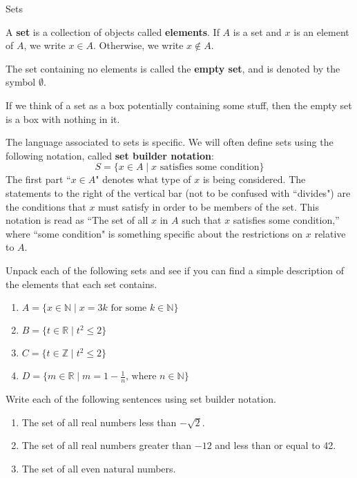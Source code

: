 \begin{section}{Sets}

\begin{definition}
A \textbf{set} is a collection of objects called \textbf{elements}. If $A$ is a set and $x$ is an element of $A$, we write
$x\in A$. Otherwise, we write $x\notin A$.
\end{definition}

\begin{definition}
The set containing no elements is called the \textbf{empty set}, and is denoted by the symbol $\emptyset$.
\end{definition}

If we think of a set as a box potentially containing some stuff, then the empty set is a box with nothing in it.

\begin{definition} 
The language associated to sets is specific.  We will often define sets using the following notation, called \textbf{set builder notation}:
\[
\boxed{S=\{x \in A\mid x \mbox{ satisfies some condition}\}}
\]
The first part ``$x \in A$" denotes what type of $x$ is being considered.  The statements to the right of the vertical bar (not to be confused with ``divides") are the conditions that $x$ must satisfy in order to be members of the set.  This notation is read as ``The set of all $x$ in $A$ such that $x$ satisfies some condition,'' where ``some condition" is something specific about the restrictions on $x$ relative to $A$.
\end{definition}

\begin{exercise}
Unpack each of the following sets and see if you can find a simple description of the elements that each set contains.
\begin{enumerate}[label=\textrm{(\alph*)}]
\item $A=\{x \in \mathbb{N} \mid x = 3k \mbox{ for some } k\in \mathbb{N} \}$
\item $B=\{t \in \mathbb{R} \mid t^2 \leq 2 \}$
\item $C=\{t \in \mathbb{Z} \mid t^2 \leq 2 \}$
\item $D=\{m \in \mathbb{R} \mid m = 1 - \frac{1}{n} \mbox{, where } n \in \mathbb{N} \}$
\end{enumerate}
\end{exercise}

\begin{exercise}
Write each of the following sentences using set builder notation.
\begin{enumerate}[label=\textrm{(\alph*)}]
\item The set of all real numbers less than $-\sqrt{2}$. 
\item The set of all real numbers greater than $-12$ and less than or equal to 42.
\item The set of all even natural numbers.
\end{enumerate}
\end{exercise}


\end{section}
